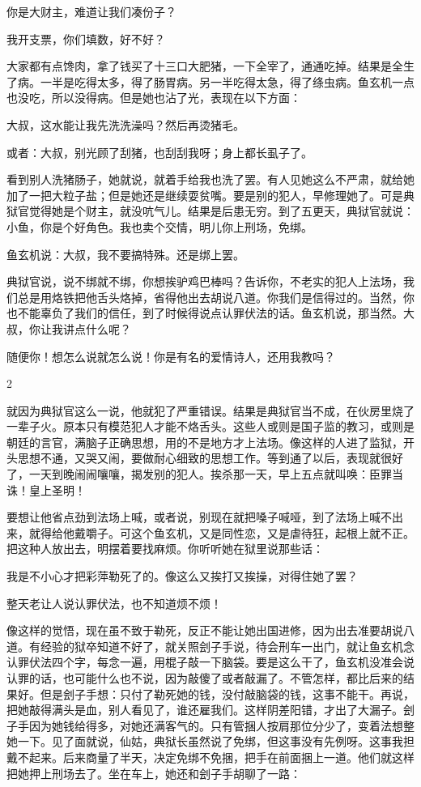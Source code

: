你是大财主，难道让我们凑份子？ 

我开支票，你们填数，好不好？ 

大家都有点馋肉，拿了钱买了十三口大肥猪，一下全宰了，通通吃掉。结果是全生了病。一半是吃得太多，得了肠胃病。另一半吃得太急，得了绦虫病。鱼玄机一点也没吃，所以没得病。但是她也沾了光，表现在以下方面： 

大叔，这水能让我先洗洗澡吗？然后再烫猪毛。 

或者：大叔，别光顾了刮猪，也刮刮我呀；身上都长虱子了。 

看到别人洗猪肠子，她就说，就着手给我也洗了罢。有人见她这么不严肃，就给她加了一把大粒子盐；但是她还是继续耍贫嘴。要是别的犯人，早修理她了。可是典狱官觉得她是个财主，就没吭气儿。结果是后患无穷。到了五更天，典狱官就说：小鱼，你是个好角色。我也卖个交情，明儿你上刑场，免绑。 

鱼玄机说：大叔，我不要搞特殊。还是绑上罢。 

典狱官说，说不绑就不绑，你想挨驴鸡巴棒吗？告诉你，不老实的犯人上法场，我们总是用烙铁把他舌头烙掉，省得他出去胡说八道。你我们是信得过的。当然，你也不能辜负了我们的信任，到了时候得说点认罪伏法的话。鱼玄机说，那当然。大叔，你让我讲点什么呢？ 

随便你！想怎么说就怎么说！你是有名的爱情诗人，还用我教吗？ 

2 

就因为典狱官这么一说，他就犯了严重错误。结果是典狱官当不成，在伙房里烧了一辈子火。原本只有模范犯人才能不烙舌头。这些人或则是国子监的教习，或则是朝廷的言官，满脑子正确思想，用的不是地方才上法场。像这样的人进了监狱，开头思想不通，又哭又闹，要做耐心细致的思想工作。等到通了以后，表现就很好了，一天到晚闹闹嚷嚷，揭发别的犯人。挨杀那一天，早上五点就叫唤：臣罪当诛！皇上圣明！ 

要想让他省点劲到法场上喊，或者说，别现在就把嗓子喊哑，到了法场上喊不出来，就得给他戴嚼子。可这个鱼玄机，又是同性恋，又是虐待狂，起根上就不正。把这种人放出去，明摆着要找麻烦。你听听她在狱里说那些话： 

我是不小心才把彩萍勒死了的。像这么又挨打又挨操，对得住她了罢？ 

整天老让人说认罪伏法，也不知道烦不烦！ 

像这样的觉悟，现在虽不致于勒死，反正不能让她出国进修，因为出去准要胡说八道。有经验的狱卒知道不好了，就关照刽子手说，待会刑车一出门，就让鱼玄机念认罪伏法四个字，每念一遍，用棍子敲一下脑袋。要是这么干了，鱼玄机没准会说认罪的话，也可能什么也不说，因为敲傻了或者敲漏了。不管怎样，都比后来的结果好。但是刽子手想：只付了勒死她的钱，没付敲脑袋的钱，这事不能干。再说，把她敲得满头是血，别人看见了，谁还雇我们。这样阴差阳错，才出了大漏子。刽子手因为她钱给得多，对她还满客气的。只有管捆人按肩那位分少了，变着法想整她一下。见了面就说，仙姑，典狱长虽然说了免绑，但这事没有先例呀。这事我担戴不起来。后来商量了半天，决定免绑不免捆，把手在前面捆上一道。他们就这样把她押上刑场去了。坐在车上，她还和刽子手胡聊了一路： 


